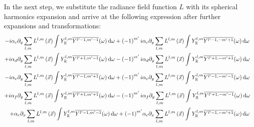 \documentclass[10pt]{scrartcl}
\begin{document}
In the next step, we substitute the radiance field function $L$ with its spherical harmonics expansion and arrive at the following expression after further expansions and transformations:
\begin{align}
-i\alpha_c\partial_y\sum_{l,m}L^{l,m}\left (\vec{x}\right)\int{Y_{\mathbb{R}}^{l,m}\overline{Y^{l'-1, m'-1}}(\omega )\ud\omega}
+\left({-1}\right)^{m'}i&\alpha_c\partial_y\sum_{l,m}L^{l,m}\left (\vec{x}\right)\int{Y_{\mathbb{R}}^{l,m}\overline{Y^{l'-1, -m'+1}}(\omega )\ud\omega}
\label{eq:real_transport_expansion_unsimplified_term1_term2}
\\
+i\alpha_d\partial_y\sum_{l,m}L^{l,m}\left (\vec{x}\right)\int{Y_{\mathbb{R}}^{l,m}\overline{Y^{l'+1, m'-1}}(\omega )\ud\omega}
-\left({-1}\right)^{m'} i &\alpha_d\partial_y\sum_{l,m}L^{l,m}\left (\vec{x}\right)\int{Y_{\mathbb{R}}^{l,m}\overline{Y^{l'+1, -m'+1}}(\omega )\ud\omega}
\label{eq:real_transport_expansion_unsimplified_term3_term4}
\\
-i\alpha_e \partial_y\sum_{l,m}L^{l,m}\left (\vec{x}\right)\int{Y_{\mathbb{R}}^{l,m}\overline{Y^{l'-1, m'+1}}(\omega )\ud\omega}
+\left({-1}\right)^{m'}i &\alpha_e \partial_y\sum_{l,m}L^{l,m}\left (\vec{x}\right)\int{Y_{\mathbb{R}}^{l,m}\overline{Y^{l'-1, -m'-1}}(\omega )\ud\omega}
\\
+i\alpha_f \partial_y\sum_{l,m}L^{l,m}\left (\vec{x}\right)\int{Y_{\mathbb{R}}^{l,m}\overline{Y^{l'+1, m'+1}}(\omega )\ud\omega}
-\left({-1}\right)^{m'}i &\alpha_f \partial_y\sum_{l,m}L^{l,m}\left (\vec{x}\right)\int{Y_{\mathbb{R}}^{l,m}\overline{Y^{l'+1, -m'-1}}(\omega )\ud\omega}
\\
+\alpha_c\partial_x\sum_{l,m}L^{l,m}\left (\vec{x}\right)\int{Y_{\mathbb{R}}^{l,m}\overline{Y^{l'-1, m'-1}}(\omega )\ud\omega}
+\left({-1}\right)^{m'}&\alpha_c\partial_x\sum_{l,m}L^{l,m}\left (\vec{x}\right)\int{Y_{\mathbb{R}}^{l,m}\overline{Y^{l'-1, -m'+1}}(\omega )\ud\omega}

\end{align}
\end{document}
